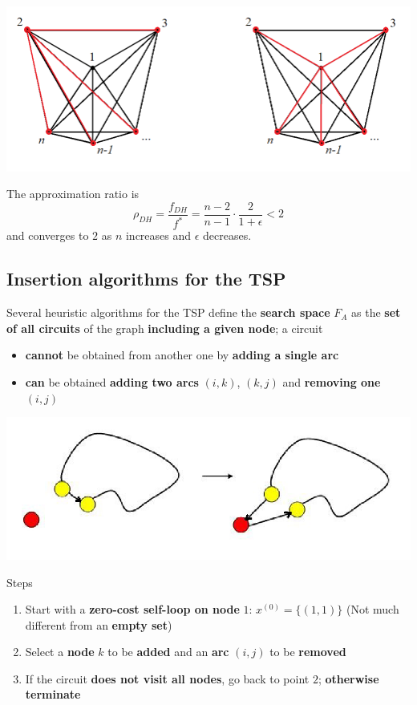 \documentclass[11pt]{article}
\begin{document}
	\begin{center}
		\includegraphics[width=0.9\columnwidth]{img/STP3}
	\end{center}
	
	The approximation ratio is 
	$$ \rho_{DH} = \frac{f_{DH}}{f^\ast} = \frac{n-2}{n-1} \cdot \frac{2}{1 + \epsilon} < 2 $$
	and converges to $2$ as $n$ increases and $\epsilon$ decreases.\\
	
	\newpage
	
	\subsection{Insertion algorithms for the TSP}
	Several heuristic algorithms for the TSP define the \textbf{search space} $F_A$ as the \textbf{set of all circuits} of the graph \textbf{including a given node}; a circuit
	\begin{itemize}
		\item \textbf{cannot} be obtained from another one by \textbf{adding a single arc}
		\item \textbf{can} be obtained \textbf{adding two arcs} $(i, k)$, $(k, j)$ and \textbf{removing one} $(i, j)$
	\end{itemize}
	
	\begin{center}
		\includegraphics[width=0.8\columnwidth]{img/IATSP1}
	\end{center}
	
	Steps
	\begin{enumerate}
		\item Start with a \textbf{zero-cost self-loop on node} $1$: $x^{(0)} = \{(1, 1)\}$ (Not much different from an \textbf{empty set})
		
		\item Select a \textbf{node} $k$ to be \textbf{added} and an \textbf{arc} $(i, j)$ to be \textbf{removed}
		
		\item If the circuit \textbf{does not visit all nodes}, go back to point $2$; \textbf{otherwise terminate}
	\end{enumerate}
	
\end{document}
